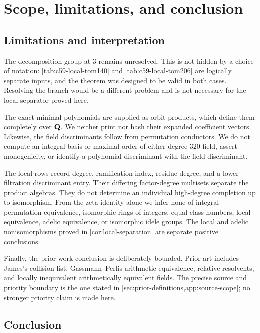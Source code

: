 \section{Scope, limitations, and conclusion}
\label{sec:scope-conclusion}

\subsection{Limitations and interpretation}

The decomposition group at $3$ remains unresolved.  This is not hidden by a
choice of notation: \cref{tab:c59-local-tom140} and
\cref{tab:c59-local-tom206} are logically separate inputs, and the theorem
was designed to be valid in both cases.  Resolving the branch would be a
different problem and is not necessary for the local separator proved here.

The exact minimal polynomials are supplied as orbit products, which define
them completely over $\mathbf{Q}$.  We neither print nor hash their expanded
coefficient vectors.  Likewise, the field discriminants follow from
permutation conductors.  We do not compute
an integral basis or maximal order of either degree-$320$ field, assert
monogenicity, or identify a polynomial discriminant with the field
discriminant.

The local rows record degree, ramification index, residue degree, and a lower-
filtration discriminant entry.  Their differing factor-degree multisets
separate the product algebras.  They do not determine an individual
high-degree completion up to isomorphism.  From the zeta identity alone we
infer none of integral permutation equivalence, isomorphic rings of integers,
equal class numbers, local equivalence, adelic equivalence, or isomorphic
idele groups.  The local and adelic nonisomorphisms proved in
\cref{cor:local-separation} are separate positive conclusions.

Finally, the prior-work conclusion is deliberately bounded.  Prior art
includes James's collision list, Gassmann--Perlis arithmetic equivalence,
relative resolvents, and locally inequivalent arithmetically equivalent
fields.
The precise source and priority boundary is the one stated in
\cref{sec:prior-definitions,app:source-scope}; no stronger priority claim is
made here.

\subsection{Conclusion}


